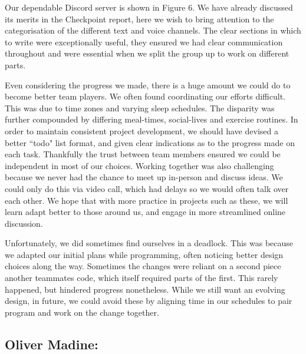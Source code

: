 \documentclass[]{article}
\begin{document}
\vspace{3mm}

Our dependable Discord server is shown in Figure 6. We have already discussed its merits in the Checkpoint report, here we wish to bring attention to the categorisation of the different text and voice channels. The clear sections in which to write were exceptionally useful, they ensured we had clear communication throughout and were essential when we split the group up to work on different parts.

\vspace{3mm}

Even considering the progress we made, there is a huge amount we could do to become better team players. We often found coordinating our efforts difficult. This was due to time zones and varying sleep schedules. The disparity was further compounded by differing meal-times, social-lives and exercise routines. In order to maintain consistent project development, we should have devised a better ``todo" list format, and given clear indications as to the progress made on each task. Thankfully the trust between team members ensured we could be independent in most of our choices.  Working together was also challenging because we never had the chance to meet up in-person and discuss ideas. We could only do this via video call, which had delays so we would often talk over each other. We hope that with more practice in projects such as these, we will learn adapt better to those around us, and engage in more streamlined online discussion. 

\vspace{3mm}

Unfortunately, we did sometimes find ourselves in a deadlock. This was because we adapted our initial plans while programming, often noticing better design choices  along the way. Sometimes the changes were reliant on a second piece another teammates code, which itself required parts of the first. This rarely happened, but hindered progress nonetheless. While we still want an evolving design, in future, we could avoid these by aligning time in our schedules to pair program and work on the change together.


\subsection*{Oliver Madine:}
\end{document}
